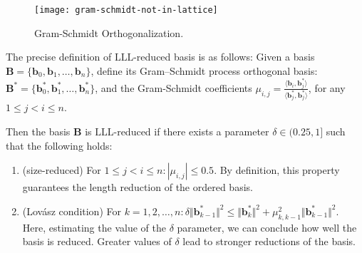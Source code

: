 


\begin{figure}[H]
\centering
\texttt{[image: gram-schmidt-not-in-lattice]}
\caption{Gram-Schmidt Orthogonalization.}
\end{figure}



The precise definition of $\mathrm{LLL}$-reduced basis is as follows: Given a basis ${\textbf{B}}=\{{\mathbf{b}}_{0},{\mathbf{b}}_{1},\dots ,{\mathbf{b}}_{n}\}$,
define its Gram–Schmidt process orthogonal basis: ${\mathbf{B}}^{*}=\{{\mathbf{b}}_{0}^{*},{\mathbf  {b}}_{1}^{*},\dots ,{\mathbf  {b}}_{n}^{*}\}$, and the Gram-Schmidt coefficients
$\mu _{{i,j}}={\frac  {\langle {\textbf  {b}}_{i},{\textbf  {b}}_{j}^{*}\rangle }{\langle {\textbf{b}}_{j}^{*},{\textbf  {b}}_{j}^{*}\rangle }}$, for any $1\leq j<i\leq n$.

Then the basis $\textbf{B}$ is $\mathrm{LLL}$-reduced if there exists a parameter $\delta  \in (0.25,1]$ such that the following holds:

\begin{enumerate}
    \item (size-reduced) For $1\leq j<i\leq n\colon \left|\mu _{{i,j}}\right|\leq 0.5$. By definition, this property guarantees the length reduction of the ordered basis.
    \item (Lovász condition) For $k = 1,2, \dots,n \colon \delta \Vert {\mathbf  {b}}_{{k-1}}^{*}\Vert ^{2}\leq \Vert {\mathbf  {b}}_{k}^{*}\Vert ^{2}+\mu _{{k,k-1}}^{2}\Vert {\mathbf  {b}}_{{k-1}}^{*}\Vert ^{2}$. Here, estimating the value of the $\delta$  parameter, we can conclude how well the basis is reduced. Greater values of $\delta$ lead to stronger reductions of the basis.    
\end{enumerate}







